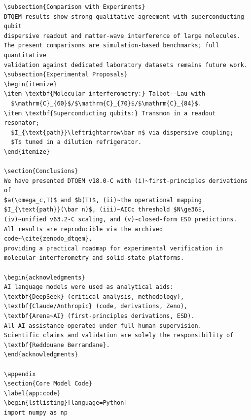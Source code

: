 \documentclass[12pt]{article}
\begin{document}
\begin{Verbatim}[fontsize=\tiny,breaklines=true]
\subsection{Comparison with Experiments}
DTQEM results show strong qualitative agreement with superconducting-qubit
dispersive readout and matter-wave interference of large molecules.
The present comparisons are simulation-based benchmarks; full quantitative
validation against dedicated laboratory datasets remains future work.
\subsection{Experimental Proposals}
\begin{itemize}
\item \textbf{Molecular interferometry:} Talbot--Lau with
  $\mathrm{C}_{60}$/$\mathrm{C}_{70}$/$\mathrm{C}_{84}$.
\item \textbf{Superconducting qubits:} Transmon in a readout resonator;
  $I_{\text{path}}\leftrightarrow\bar n$ via dispersive coupling;
  $T$ tuned in a dilution refrigerator.
\end{itemize}

\section{Conclusions}
We have presented DTQEM v18.0-C with (i)~first-principles derivations of
$a(\omega_c,T)$ and $b(T)$, (ii)~the operational mapping
$I_{\text{path}}(\bar n)$, (iii)~AICc threshold $N\ge36$,
(iv)~unified v63.2-C scaling, and (v)~closed-form ESD predictions.
All results are reproducible via the archived code~\cite{zenodo_dtqem},
providing a practical roadmap for experimental verification in
molecular interferometry and solid-state platforms.

\begin{acknowledgments}
AI language models were used as analytical aids:
\textbf{DeepSeek} (critical analysis, methodology),
\textbf{Claude/Anthropic} (code, derivations, Zeno),
\textbf{Arena~AI} (first-principles derivations, ESD).
All AI assistance operated under full human supervision.
Scientific claims and validation are solely the responsibility of
\textbf{Reddouane Berramdane}.
\end{acknowledgments}

\appendix
\section{Core Model Code}
\label{app:code}
\begin{lstlisting}[language=Python]
import numpy as np


\end{Verbatim}
\end{document}
